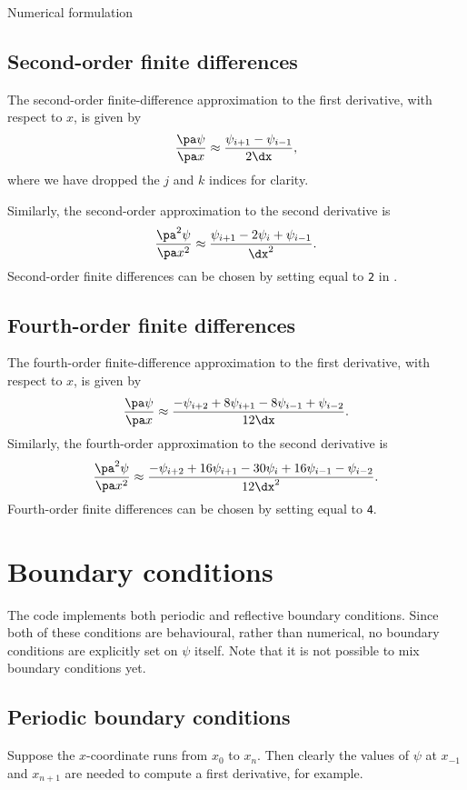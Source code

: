 \begin{chapter}{\label{cha:numerics}Numerical formulation}
  \subsection{Second-order finite differences}
  The second-order finite-difference approximation to the first derivative,
  with respect to $x$, is given by
  \begin{equation*}
    \frac{\pa \psi}{\pa x} \approx \frac{\psi_{i+1} - \psi_{i-1}}{2\dx},
  \end{equation*}
  where we have dropped the $j$ and $k$ indices for clarity.

  Similarly, the second-order approximation to the second derivative is
  \begin{equation*}
    \frac{\pa^{2} \psi}{\pa x^{2}} \approx \frac{\psi_{i+1} - 2\psi_{i} +
    \psi_{i-1}}{\dx^{2}}.
  \end{equation*}
  Second-order finite differences can be chosen by setting  equal
  to \verb"2" in .

  \subsection{Fourth-order finite differences}
  The fourth-order finite-difference approximation to the first derivative,
  with respect to $x$, is given by
  \begin{equation*}
    \frac{\pa \psi}{\pa x} \approx \frac{-\psi_{i+2} +8\psi_{i+1} - 8\psi_{i-1}
    + \psi_{i-2}}{12\dx}.
  \end{equation*}
  Similarly, the fourth-order approximation to the second derivative is
  \begin{equation*}
    \frac{\pa^{2} \psi}{\pa x^{2}} \approx \frac{-\psi_{i+2} + 16\psi_{i+1} -
    30\psi_{i} + 16\psi_{i-1} - \psi_{i-2}}{12\dx^{2}}.
  \end{equation*}
  Fourth-order finite differences can be chosen by setting  equal
  to \verb"4".

  \section{Boundary conditions}
  The code implements both periodic and reflective boundary conditions.  Since
  both of these conditions are behavioural, rather than numerical, no boundary
  conditions are explicitly set on $\psi$ itself.  Note that it is not possible
  to mix boundary conditions yet.

  \subsection{Periodic boundary conditions}
  Suppose the $x$-coordinate runs from $x_{0}$ to $x_{n}$.  Then clearly the
  values of $\psi$ at $x_{-1}$ and $x_{n+1}$ are needed to compute a first
  derivative, for example.


\end{chapter}
